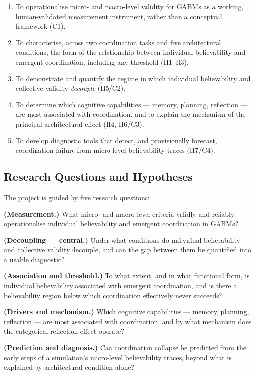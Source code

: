\documentclass[11pt]{article}
\begin{document}
\begin{enumerate}
    \item To operationalise micro- and macro-level validity for GABMs as a working, human-validated measurement instrument, rather than a conceptual framework (C1).
    \item To characterise, across two coordination tasks and five architectural conditions, the form of the relationship between individual believability and emergent coordination, including any threshold (H1--H3).
    \item To demonstrate and quantify the regime in which individual believability and collective validity \emph{decouple} (H5/C2).
    \item To determine which cognitive capabilities --- memory, planning, reflection --- are most associated with coordination, and to explain the mechanism of the principal architectural effect (H4, H6/C3).
    \item To develop diagnostic tools that detect, and provisionally forecast, coordination failure from micro-level believability traces (H7/C4).
\end{enumerate}

\subsection{Research Questions and Hypotheses}

The project is guided by five research questions:

\begin{description}[leftmargin=1.6cm, style=nextline]
    \item[RQ1] \textbf{(Measurement.)} What micro- and macro-level criteria validly and reliably operationalise individual believability and emergent coordination in GABMs?
    \item[RQ2] \textbf{(Decoupling --- central.)} Under what conditions do individual believability and collective validity decouple, and can the gap between them be quantified into a usable diagnostic?
    \item[RQ3] \textbf{(Association and threshold.)} To what extent, and in what functional form, is individual believability associated with emergent coordination, and is there a believability region below which coordination effectively never succeeds?
    \item[RQ4] \textbf{(Drivers and mechanism.)} Which cognitive capabilities --- memory, planning, reflection --- are most associated with coordination, and by what mechanism does the categorical reflection effect operate?
    \item[RQ5] \textbf{(Prediction and diagnosis.)} Can coordination collapse be predicted from the early steps of a simulation's micro-level believability traces, beyond what is explained by architectural condition alone?
\end{description}
\end{document}
